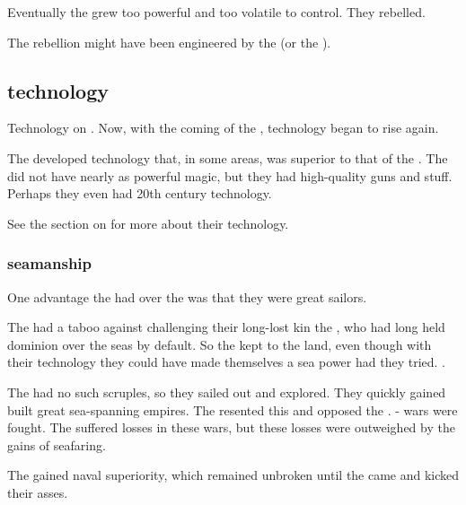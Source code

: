 Eventually the \aryothim grew too powerful and too volatile to control.
They rebelled. 

The \aryoth rebellion might have been engineered by the  (or the ).









\subsection{\Aryoth technology}
Technology on \Miith {}. 
Now, with the coming of the \aryothim, technology began to rise again. 

The \aryothim developed technology that, in some areas, was superior to that of the \quiljaaran. 
The \aryothim did not have nearly as powerful magic, but they had high-quality guns and stuff.
Perhaps they even had 20th century technology. 

See the section on  for more about their technology.





\subsubsection{\Aryoth seamanship}
One advantage the \aryothim{} had over the \quiljaaran{} was that they were great sailors. 

The \quiljaaran{} had a taboo against challenging their long-lost kin the \nagae{}, who had long held dominion over the seas by default. 
So the \quiljaaran{} kept to the land, even though with their technology they could have made themselves a sea power had they tried. 
. 

The \aryothim{} had no such scruples, so they sailed out and explored. 
They quickly gained built great sea-spanning empires. 
The \nagae{} resented this and opposed the \aryothim. 
\Naga-\aryoth{} wars were fought. 
The \aryothim{} suffered losses in these wars, but these losses were outweighed by the gains of seafaring. 

The \aryothim{} gained naval superiority, which remained unbroken until the \dragons came and kicked their asses. 





